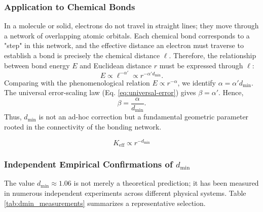 \documentclass[12pt,a4paper]{article}
\theoremstyle{remark}
\newcommand{\Keff}{K_{\mathrm{eff}}}
\begin{document}
	\subsubsection{Application to Chemical Bonds}
	
	In a molecule or solid, electrons do not travel in straight lines; they move through a network of overlapping atomic orbitals. Each chemical bond corresponds to a "step" in this network, and the effective distance an electron must traverse to establish a bond is precisely the chemical distance \(\ell\). Therefore, the relationship between bond energy \(E\) and Euclidean distance \(r\) must be expressed through \(\ell\):
	\begin{equation}
		E \propto \ell^{-\alpha'} \propto r^{-\alpha' d_{\text{min}}}.
		\label{eq:E_through_chemical_distance}
	\end{equation}
	Comparing with the phenomenological relation \(E \propto r^{-\alpha}\), we identify \(\alpha = \alpha' d_{\text{min}}\). The universal error-scaling law (Eq. \ref{eq:universal-error}) gives \(\beta = \alpha'\). Hence,
	\begin{equation}
		\beta = \frac{\alpha}{d_{\text{min}}}.
		\label{eq:beta_from_alpha}
	\end{equation}
	Thus, \(d_{\text{min}}\) is not an ad-hoc correction but a fundamental geometric parameter rooted in the connectivity of the bonding network.
	
	\begin{equation}
		\Keff \propto r^{-d_{\text{min}}}
		\label{eq:keff-scaling}
	\end{equation}
	
	\subsubsection{Independent Empirical Confirmations of \(d_{\text{min}}\)}
	
	The value \(d_{\text{min}} \approx 1.06\) is not merely a theoretical prediction; it has been measured in numerous independent experiments across different physical systems. Table \ref{tab:dmin_measurements} summarizes a representative selection.
	
\end{document}
